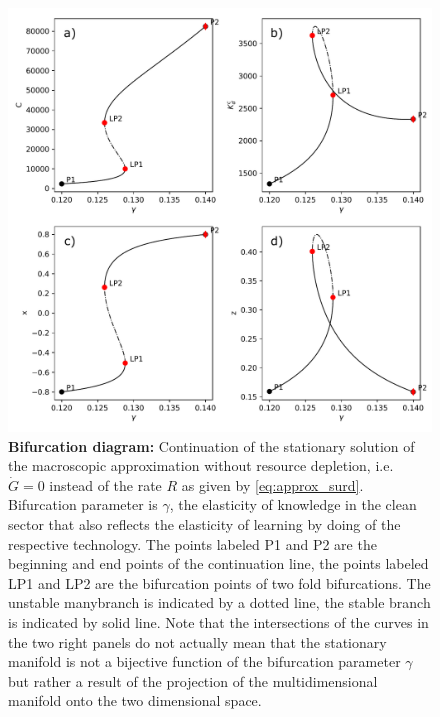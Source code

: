 \begin{figure}[ht!]
\centering\includegraphics[width=.95\linewidth]{figures/ba_plot.pdf}
\caption{\textbf{Bifurcation diagram:} Continuation of the stationary solution of the macroscopic approximation without resource depletion, i.e. $\dot{G} = 0$ instead of the rate $R$ as given by  \cref{eq:approx_surd}. Bifurcation parameter is $\gamma$, the elasticity of knowledge in the clean sector that also reflects the elasticity of learning by doing of the respective technology. The points labeled P1 and P2 are the beginning and end points of the continuation line, the points labeled LP1 and LP2 are the bifurcation points of two fold bifurcations. The unstable manybranch is indicated by a dotted line, the stable branch is indicated by solid line. Note that the intersections of the curves in the two right panels do not actually mean that the stationary manifold is not a bijective function of the bifurcation parameter $\gamma$ but rather a result of the projection of the multidimensional manifold onto the two dimensional space.\label{fig:bifurcation_analysis}}
\end{figure}

